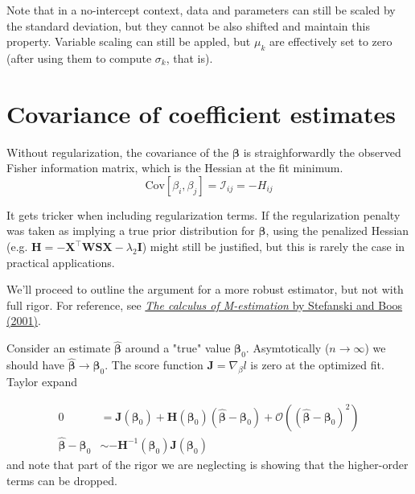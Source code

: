 \documentclass{article}
\begin{document}
Note that in a no-intercept context, data and parameters can still be scaled by
the standard deviation, but they cannot be also shifted and maintain this
property. Variable scaling can still be appled, but $\mu_k$ are effectively set
to zero (after using them to compute $\sigma_k$, that is).

\section{Covariance of coefficient estimates}

Without regularization, the covariance of the $\boldsymbol{\beta}$ is
straighforwardly the observed Fisher information matrix, which is the Hessian
at the fit minimum.
\[\textrm{Cov}[\beta_i , \beta_j] = \mathcal{I}_{ij} = -H_{ij} \]

It gets tricker when including regularization terms. If the regularization
penalty was taken as implying a true prior distribution for
$\boldsymbol{\beta}$, using the penalized Hessian (e.g. \(\mathbf{H} =
-\mathbf{X}^\intercal \mathbf{WSX} - \lambda_2 \mathbf{I} \)) might still be
justified, but this is rarely the case in practical applications.

We'll proceed to outline the argument for a more robust estimator, but not with
full rigor. For reference, see
\href{https://repository.lib.ncsu.edu/server/api/core/bitstreams/40ad2126-511c-49e8-b15f-a02683725978/content}{\emph{The
calculus of M-estimation} by Stefanski and Boos (2001)}.

Consider an estimate $\hat{\boldsymbol{\beta}}$ around a "true" value
$\boldsymbol{\beta}_0$. Asymtotically ($n \rightarrow \infty$) we should have
\(\hat{\boldsymbol \beta} \rightarrow \boldsymbol \beta_0\). The score function
\(\mathbf{J} = \nabla_\beta l\) is zero at the optimized fit. Taylor expand
 
\begin{align}
  0 &= \mathbf{J}(\boldsymbol\beta_0) + \mathbf{H}(\boldsymbol\beta_0)
  (\hat{\boldsymbol\beta} - \boldsymbol\beta_0) +
  \mathcal{O}\left((\hat{\boldsymbol\beta} - \boldsymbol\beta_0)^2 \right) \\
  \hat{\boldsymbol\beta} - \boldsymbol\beta_0 &\sim -\mathbf{H}^{-1}(\boldsymbol\beta_0) \mathbf{J}(\boldsymbol\beta_0)
\end{align}
and note that part of the rigor we are neglecting is showing that the
higher-order terms can be dropped.
\end{document}
